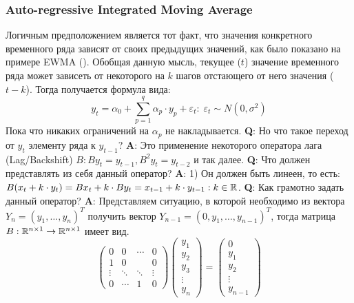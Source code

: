 \subsubsection{Auto-regressive Integrated Moving Average}
	Логичным предположением является тот факт, что значения конкретного временного ряда зависят от своих предыдущих значений, как было показано на примере EWMA (). Обобщая данную мысль, текущее ($t$) значение временного ряда может зависеть от некоторого на $k$ шагов отстающего от него значения ($t - k$). Тогда получается формула вида:
	\begin{equation}
		y_t = \alpha_0 + \sum_{p = 1}^{q} \alpha_p \cdot y_p + \varepsilon_t: \; \varepsilon_t \sim N(0,\sigma^2)
	\end{equation}
	Пока что никаких ограничений на $\alpha_p$ не накладывается. \textbf{Q}: Но что такое переход от $y_t$ элементу ряда к $y_{t - 1}$? \textbf{A}: Это применение некоторого оператора лага (Lag/Backshift) $B: By_t = y_{t - 1}, B^2y_t = y_{t - 2}$ и так далее. \textbf{Q}: Что должен представлять из себя данный оператор? \textbf{A}: 1) Он должен быть линеен, то есть: $B(x_t + k \cdot y_t) = Bx_t + k \cdot By_t = x_{t - 1} + k \cdot y_{t - 1}: k \in \mathbb{R}$. \textbf{Q}: Как грамотно задать данный оператор? \textbf{A}: Представляем ситуацию, в которой необходимо из вектора $Y_n = (y_1, \ldots, y_n)^T$ получить вектор $Y_{n - 1} =  (0, y_1, \ldots, y_{n - 1})^T$, тогда матрица $B: \mathbb{R}^{n \times 1} \to \mathbb{R}^{n \times 1}$ имеет вид.
	\begin{equation}
		\left(\begin{matrix}
			0 & 0 & \cdots & 0\\
			1 & 0 & & 0\\
			\vdots & \ddots & \ddots & \vdots\\
			0 & \cdots & 1 & 0
		\end{matrix}\right) 
		\left(\begin{matrix}
			y_1\\ y_2\\ y_3 \\ \vdots \\ y_n
		\end{matrix}\right) = 
		\left(\begin{matrix}
			0\\ y_1\\ y_2 \\ \vdots \\ y_{n - 1}
		\end{matrix}\right)
	\end{equation}
